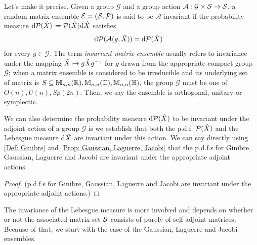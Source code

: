 Let's make it precise. Given a group $\mathcal{G}$ and a group action $\mathcal{A}: \mathcal{G}\times \mathcal{S} \rightarrow \mathcal{S}$, a random matrix ensemble $\mathcal{E} = (\mathcal{S}, \mathcal{P})$ is said to be $\mathcal{A}$-invariant if the probability measure $\dd \eP(\m{X}) \deff \eP(\m{X}) \dd \m{X}$ satisfies
\begin{equation}
	\mathrm{d} \mathcal{P}(\mathcal{A}(g, \hat X)) = \mathrm{d} \mathcal{P}(\hat X)
\end{equation}
for every $g \in \mathcal{G}$. The term \textit{invariant matrix ensemble} usually refers to invariance under the mapping $\hat X \mapsto g\hat Xg^{-1}$ for $g$ drawn from the appropriate compact group $\mathcal{G}$; when a matrix ensemble is considered to be irreducible and its underlying set of matrix is $S \subseteq \mathbb{M}_{n,n}(\mathbb{R}), \mathbb{M}_{n,n}(\mathbb{C}), \mathbb{M}_{n,n}(\mathbb{H})$, the group $\mathcal{G}$ must be one of $O(n), U(n), Sp(2n)$. Then, we say the ensemble is orthogonal, unitary or symplectic.

We can also determine the probability measure $\mathrm{d} \mathcal{P}(\hat X)$ to be invariant under the adjoint action of a group $\mathcal{G}$ is we establish that both the p.d.f. $\mathcal{P}(\hat X)$ and the Lebesgue measure $\mathrm{d} \hat X$ are invariant under this action. We can say directly using \ref{Def: Ginibre} and \ref{Prop: Gaussian, Laguerre, Jacobi} that the p.d.f.s for Ginibre, Gaussian, Laguerre and Jacobi are invariant under the appropriate adjoint actions.

\begin{proof}
	(p.d.f.s for Ginibre, Gaussian, Laguerre and Jacobi are invariant under the appropriate adjoint actions.)
\end{proof}

The invariance of the Lebesgue measure is more involved and depends on whether or not the associated matrix set $\mathcal{S}$ consists of purely of self-adjoint matrices. Because of that, we start with the case of the Gaussian, Laguerre and Jacobi ensembles.

